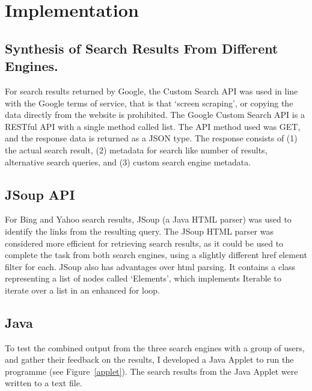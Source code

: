 \documentclass[a4paper, 11pt]{article}
\begin{document}
\section{Implementation}

\subsection{Synthesis of Search Results From Different Engines.}
For search results returned by Google, the Custom Search API was used in line with the Google terms of service, that is that `screen scraping', or copying the data directly from the website is prohibited. The Google Custom Search API is a RESTful API with a single method called list. The API method used was GET, and the response data is returned as a JSON type. The response consists of (1) the actual search result, (2) metadata for search like number of results, alternative search queries, and (3) custom search engine metadata. 

\subsection{JSoup API}
For Bing and Yahoo search results, JSoup (a Java HTML parser) was used to identify the links from the resulting query. The JSoup HTML parser was considered more efficient for retrieving search results, as it could be used to complete the task from both search engines, using a slightly different href element filter for each. JSoup also has advantages over html parsing. It contains a class representing a list of nodes called `Elements', which implements Iterable to iterate over a list in an enhanced for loop.

\subsection{Java}
To test the combined output from the three search engines with a group of users, and gather their feedback on the results, I developed a Java Applet to run the programme (see Figure~\ref{applet}). The search results from the Java Applet were written to a text file.
\end{document}
